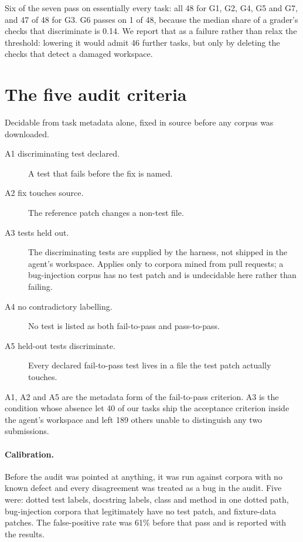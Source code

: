 \documentclass[11pt]{article}
\begin{document}
Six of the seven pass on essentially every task: all 48 for G1, G2, G4, G5 and
G7, and 47 of 48 for G3. G6 passes on 1 of 48, because the median share of a
grader's checks that discriminate is 0.14. We report that as a failure rather
than relax the threshold: lowering it would admit 46 further tasks, but only by
deleting the checks that detect a damaged workspace.

\section{The five audit criteria}
\label{app:audit}

Decidable from task metadata alone, fixed in source before any corpus was
downloaded.

\begin{description}
\item[A1 discriminating test declared.] A test that fails before the fix is
      named.
\item[A2 fix touches source.] The reference patch changes a non-test file.
\item[A3 tests held out.] The discriminating tests are supplied by the harness,
      not shipped in the agent's workspace. Applies only to corpora mined from
      pull requests; a bug-injection corpus has no test patch and is undecidable
      here rather than failing.
\item[A4 no contradictory labelling.] No test is listed as both fail-to-pass and
      pass-to-pass.
\item[A5 held-out tests discriminate.] Every declared fail-to-pass test lives in
      a file the test patch actually touches.
\end{description}

A1, A2 and A5 are the metadata form of the fail-to-pass criterion. A3 is the
condition whose absence let 40 of our tasks ship the acceptance criterion inside
the agent's workspace and left 189 others unable to distinguish any two
submissions.

\paragraph{Calibration.} Before the audit was pointed at anything, it was run
against corpora with no known defect and every disagreement was treated as a
bug in the audit. Five were: dotted test labels, docstring labels, class and
method in one dotted path, bug-injection corpora that legitimately have no test
patch, and fixture-data patches. The false-positive rate was 61\% before that
pass and is reported with the results.
\end{document}
